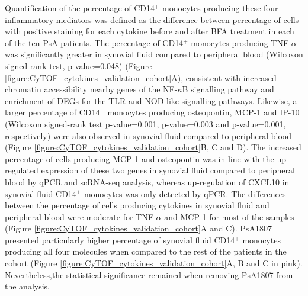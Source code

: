 Quantification of the percentage of CD14$^+$ monocytes producing these four inflammatory mediators was defined as the difference between percentage of cells with positive staining for each cytokine before and after BFA treatment in each of the ten PsA patients. The percentage of CD14$^+$ monocytes producing TNF-$\alpha$ was significantly greater in synovial fluid compared to peripheral blood (Wilcoxon signed-rank test, p-value=0.048) (Figure \ref{figure:CyTOF_cytokines_validation_cohort}A), consistent with increased chromatin accessibility nearby genes of the NF-$\kappa$B signalling pathway and enrichment of DEGs for the TLR and NOD-like signalling pathways. %
Likewise, a larger percentage of CD14$^+$ monocytes producing osteopontin, MCP-1 and IP-10 (Wilcoxon signed-rank test p-value=0.001, p-value=0.003 and p-value=0.001, respectively) were also observed in synovial fluid compared to peripheral blood (Figure \ref{figure:CyTOF_cytokines_validation_cohort}B, C and D). The increased percentage of cells producing MCP-1 and osteopontin was in line with the up-regulated expression of these two genes in synovial fluid compared to peripheral blood by qPCR and scRNA-seq analysis, whereas up-regulation of CXCL10 in synovial fluid CD14$^+$ monocytes was only detected by qPCR. The differences between the percentage of cells producing cytokines in synovial fluid and peripheral blood were moderate for TNF-$\alpha$ and MCP-1 for most of the samples (Figure \ref{figure:CyTOF_cytokines_validation_cohort}A and C). PsA1807 presented particularly higher percentage of synovial fluid CD14$^+$ monocytes producing all four molecules when compared to the rest of the patients in the cohort (Figure \ref{figure:CyTOF_cytokines_validation_cohort}A, B and C in pink). Nevertheless,the statistical significance remained when removing PsA1807 from the analysis.



